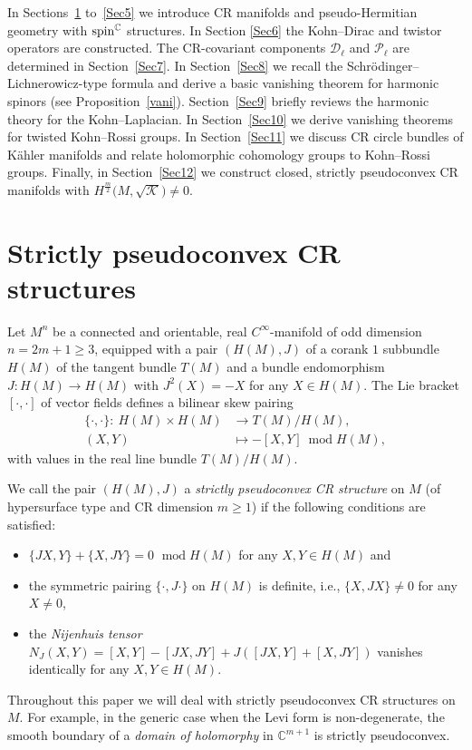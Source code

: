 \documentclass[10pt,a4paper]{amsart}
\numberwithin{equation}{section}
\newcommand{\CC}{\mathbb{C}}
\begin{document}
In Sections~\ref{Sec2} to~\ref{Sec5} we introduce CR manifolds and pseudo-Hermitian geometry with ${\rm spin}^\CC$ structures.
In Section \ref{Sec6} the Kohn--Dirac and twistor operators are constructed. The CR-covariant
components $\mathcal{D}_\ell$ and $\mathcal{P}_\ell$ are determined in Section~\ref{Sec7}. In Section~\ref{Sec8} we recall
the Schr\"odinger--Lichnerowicz-type formula and derive a basic vanishing theorem for harmonic spi\-nors (see Proposition~\ref{vani}).
Section~\ref{Sec9} briefly reviews the harmonic theory for the Kohn--Laplacian. In Section~\ref{Sec10} we derive
 vanishing theorems for twisted Kohn--Rossi groups. In Section~\ref{Sec11} we discuss CR circle bundles of K\"ahler manifolds and
relate holomorphic cohomology groups to Kohn--Rossi groups. Finally, in Section~\ref{Sec12} we construct closed, strictly pseudoconvex CR mani\-folds
with $H^{\frac{m}{2}}\big(M,\sqrt{\mathcal{K}}\big)\neq 0$.

\section{Strictly pseudoconvex CR structures} \label{Sec2}

Let $M^n$ be a connected and orientable, real $C^\infty$-manifold of odd dimension $n=2m+1\geq 3$, equipped with a pair $(H(M),J)$
of a corank $1$ subbundle $H(M)$ of the tangent bundle $T(M)$ and a bundle endomorphism $J\colon H(M)\to H(M)$
with $J^2(X)=-X$ for any $X\in H(M)$. The Lie bracket $[\cdot,\cdot]$ of vector fields defines a bilinear skew pairing
\begin{align*}\{\cdot,\cdot\}\colon \ H(M)\times H(M) &\to T(M)/H(M),\\
 (X,Y)&\mapsto -[X,Y]\ \operatorname{mod} H(M),
\end{align*}
with values in the real line bundle $T(M)/H(M)$.

We call the pair $(H(M),J)$ a {\em strictly pseudoconvex CR structure} on $M$ (of hypersurface type and CR dimension $m\geq 1$)
if the following conditions are satisfied:
\begin{itemize}\itemsep=0pt
\item $\{JX,Y\}+\{X,JY\}=0$ $\operatorname{mod} H(M)$ for any $X,Y\in H(M)$ and
\item the symmetric pairing $\{\cdot,J\cdot\}$ on $H(M)$ is definite, i.e., $\{X,JX\}\neq 0$ for any $X\neq 0$,
\item the {\em Nijenhuis tensor} $N_J(X,Y)= [X,Y]-[JX,JY]+J([JX,Y]+[X,JY])$ vanishes identically for any $X,Y\in H(M)$.
\end{itemize}
Throughout this paper we will deal with strictly pseudoconvex CR structures on $M$.
For example, in the generic case when the Levi form is non-degenerate,
the smooth boundary of a {\em domain of holomorphy} in $\CC^{m+1}$ is strictly pseudoconvex.
\end{document}
